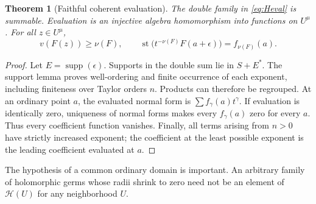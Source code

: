 \documentclass[11pt,oneside]{article}
\numberwithin{equation}{section}
\newtheorem{theorem}{Theorem}[section]
\theoremstyle{definition}
\theoremstyle{remark}\newtheorem{remark}[theorem]{Remark}
\newcommand{\HH}{\mathscr H}
\newcommand{\supp}{\operatorname{supp}}
\newcommand{\st}{\operatorname{st}}
\begin{document}
\begin{theorem}[Faithful coherent evaluation]\label{thm:evaluation}
The double family in \eqref{eq:Heval} is summable. Evaluation is an injective
algebra homomorphism into functions on $U^\mu$. For all $z\in U^\mu$,
\begin{equation}\label{eq:evalval}
 v(F(z))\geq\nu(F),\qquad
 \st\bigl(t^{-\nu(F)}F(a+\epsilon)\bigr)=f_{\nu(F)}(a).
\end{equation}
\end{theorem}
\begin{proof}
Let $E=\supp(\epsilon)$. Supports in the double sum lie in $S+E^*$.
The support lemma proves well-ordering and finite occurrence of each
exponent, including finiteness over Taylor orders $n$. Products can
therefore be regrouped. At an ordinary point $a$, the evaluated normal
form is $\sum f_\gamma(a)t^\gamma$. If evaluation is identically zero,
uniqueness of normal forms makes every $f_\gamma(a)$ zero for every $a$.
Thus every coefficient function vanishes. Finally, all terms arising
from $n>0$ have strictly increased exponent; the coefficient at the least
possible exponent is the leading coefficient evaluated at $a$.
\end{proof}
The hypothesis of a common ordinary domain is important. An arbitrary
family of holomorphic germs whose radii shrink to zero need not be an
element of $\HH(U)$ for any neighborhood $U$.
\end{document}
